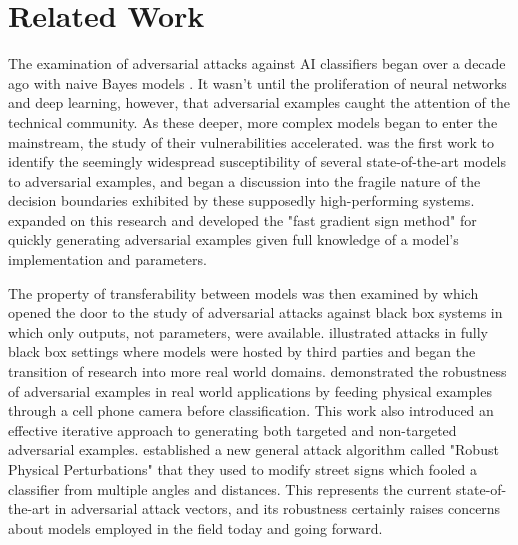 \documentclass[]{article}
\begin{document}

\section{Related Work}

The examination of adversarial attacks against AI classifiers began over a decade ago with naive Bayes models \citep{dalvi2004adversarial}. It wasn't until the proliferation of neural networks and deep learning, however, that adversarial examples caught the attention of the technical community. As these deeper, more complex models began to enter the mainstream, the study of their vulnerabilities accelerated. \citet{DBLP:journals/corr/SzegedyZSBEGF13} was the first work to identify the seemingly widespread susceptibility of several state-of-the-art models to adversarial examples, and began a discussion into the fragile nature of the decision boundaries exhibited by these supposedly high-performing systems. \citet{goodfellow2014} expanded on this research and developed the "fast gradient sign method" for quickly generating adversarial examples given full knowledge of a model's implementation and parameters. 

The property of transferability between models was then examined by \citet{DBLP:journals/corr/PapernotMG16} which opened the door to the study of adversarial attacks against black box systems in which only outputs, not parameters, were available. \citet{DBLP:journals/corr/KurakinGB16} illustrated attacks in fully black box settings where models were hosted by third parties and began the transition of research into more real world domains. \citet{DBLP:journals/corr/PapernotMGJCS16} demonstrated the robustness of adversarial examples in real world applications by feeding physical examples through a cell phone camera before classification. This work also introduced an effective iterative approach to generating both targeted and non-targeted adversarial examples. \citet{DBLP:journals/corr/EvtimovEFKLPRS17} established a new general attack algorithm called "Robust Physical Perturbations" that they used to modify street signs which fooled a classifier from multiple angles and distances. This represents the current state-of-the-art in adversarial attack vectors, and its robustness certainly raises concerns about models employed in the field today and going forward.
\end{document}
